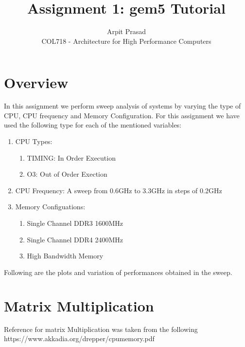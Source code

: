 \documentclass[12pt]{article}
\begin{document}
 
 
\title{Assignment 1: gem5 Tutorial}
\author{Arpit Prasad\\ 
COL718 - Architecture for High Performance Computers}

\maketitle

\section{Overview}

In this assignment we perform sweep analysis of systems by varying the type of CPU, CPU frequency and Memory Configuration. For this assignment we have used the 
following type for each of the mentioned variables:
\begin{enumerate}
    \item CPU Types:
    \begin{enumerate}
        \item TIMING: In Order Execution
        \item O3: Out of Order Exection
    \end{enumerate}
    \item CPU Frequency: A sweep from 0.6GHz to 3.3GHz in steps of 0.2GHz
    \item Memory Configuations:
    \begin{enumerate}
        \item Single Channel DDR3 1600MHz
        \item Single Channel DDR4 2400MHz
        \item High Bandwidth Memory 
    \end{enumerate}
\end{enumerate}

Following are the plots and variation of performances obtained in the sweep.

\section{Matrix Multiplication}

Reference for matrix Multiplication was taken from the following https://www.akkadia.org/drepper/cpumemory.pdf
\end{document}
